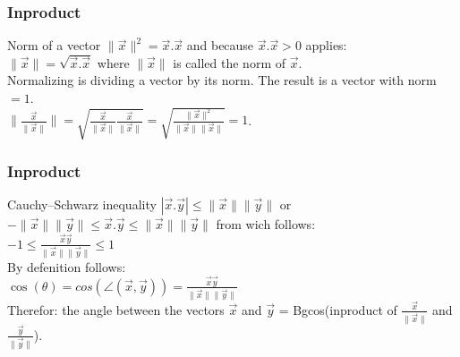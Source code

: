 \begin{frame}
	\frametitle{Inproduct}
	\begin{block}{Norm of a vector}
		$\|\overrightarrow{x}\|^2=\overrightarrow{x}.\overrightarrow{x}$ and because $\overrightarrow{x}.\overrightarrow{x}>0$ applies:\\
		$\|\overrightarrow{x}\|=\sqrt{\overrightarrow{x}.\overrightarrow{x}}$ where $\|\overrightarrow{x}\|$ is called the norm of $\overrightarrow{x}$.\\
		Normalizing is dividing a vector by its norm. The result is a vector with norm $=1$.\\
		$\|\frac{\overrightarrow{x}}{\|\overrightarrow{x}\|}\|= \sqrt{\frac{\overrightarrow{x}}{\|\overrightarrow{x}\|} \frac{\overrightarrow{x}}{\|\overrightarrow{x}\|}}= \sqrt{\frac{\|\overrightarrow{x}\|^2}{\|\overrightarrow{x}\|\|\overrightarrow{x}\|}}=1$.
	\end{block} 
\end{frame}

\begin{frame}
	\frametitle{Inproduct}
	\begin{block}{Cauchy–Schwarz inequality}
		$|\overrightarrow{x}.\overrightarrow{y}|\leq \|\overrightarrow{x}\|\|\overrightarrow{y}\|$ or \\
		$-\|\overrightarrow{x}\|\|\overrightarrow{y}\|\leq \overrightarrow{x}.\overrightarrow{y}\leq \|\overrightarrow{x}\|\|\overrightarrow{y}\|$ from wich follows:\\
		$-1 \leq\frac{\overrightarrow{x}\overrightarrow{y}} {\|\overrightarrow{x}\|\|\overrightarrow{y}\|} \leq 1$\\
		By defenition follows:\\
		$\cos(\theta)=cos(\angle (\overrightarrow{x}, \overrightarrow{y}))= \frac{\overrightarrow{x}\overrightarrow{y}} {\|\overrightarrow{x}\|\|\overrightarrow{y}\|}$\\
		Therefor: the angle between the vectors $\overrightarrow{x}$ and $\overrightarrow{y}$ = Bgcos(inproduct of $\frac{\overrightarrow{x}}{\|\overrightarrow{x}\|}$ and $\frac{\overrightarrow{y}}{\|\overrightarrow{y}\|}$).
	\end{block} 
\end{frame}

